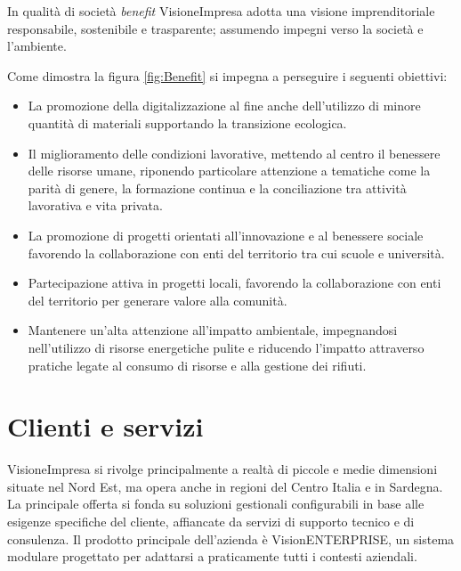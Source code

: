 In qualità di società \textit{benefit} VisioneImpresa adotta una visione imprenditoriale responsabile, sostenibile e trasparente; assumendo impegni verso la società e l'ambiente.

Come dimostra la figura \ref{fig:Benefit} si impegna a perseguire i seguenti obiettivi:
\begin{itemize}
    \item La promozione della digitalizzazione al fine anche dell'utilizzo di minore quantità di materiali supportando la transizione ecologica.
    \item Il miglioramento delle condizioni lavorative, mettendo al centro il benessere delle risorse umane, riponendo particolare attenzione a tematiche come la parità di genere, la formazione continua e la conciliazione tra attività lavorativa e vita privata.
    \item La promozione di progetti orientati all'innovazione e al benessere sociale favorendo la collaborazione con enti del territorio tra cui scuole e università.
    \item Partecipazione attiva in progetti locali, favorendo la collaborazione con enti del territorio per generare valore alla comunità.
    \item Mantenere un'alta attenzione all'impatto ambientale, impegnandosi nell'utilizzo di risorse energetiche pulite e riducendo l'impatto attraverso pratiche legate al consumo di risorse e alla gestione dei rifiuti.
\end{itemize}


\section{Clienti e servizi}


VisioneImpresa si rivolge principalmente a realtà di piccole e medie dimensioni situate nel Nord Est, ma opera anche in regioni del Centro Italia e in Sardegna. La principale offerta si fonda su soluzioni gestionali configurabili in base alle esigenze specifiche del cliente, affiancate da servizi di supporto tecnico e di consulenza. 
Il prodotto principale dell'azienda è VisionENTERPRISE, un sistema  modulare progettato per adattarsi a praticamente tutti i contesti aziendali.

